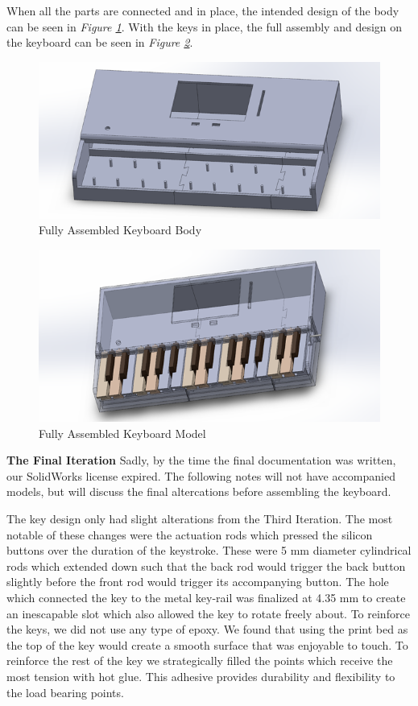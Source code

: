 When all the parts are connected and in place, the intended design of the body can be seen in \textit{Figure \ref{fig:final_model1}}. With the keys in place, the full assembly and design on the keyboard can be seen in \textit{Figure \ref{fig:final_model2}}.

\begin{figure}[h!]
  \centering
  \includegraphics[width=0.8\linewidth]{image/FinalModel1.png}
  \caption{Fully Assembled Keyboard Body}
  \label{fig:final_model1}
\end{figure}

\begin{figure}[h!]
  \centering
  \includegraphics[width=0.8\linewidth]{image/FinalModel2.png}
  \caption{Fully Assembled Keyboard Model}
  \label{fig:final_model2}
\end{figure}
\clearpage

\textbf{The Final Iteration}
Sadly, by the time the final documentation was written, our SolidWorks license expired. The following notes will not have accompanied models, but will discuss the final altercations before assembling the keyboard.

The key design only had slight alterations from the Third Iteration. The most notable of these changes were the actuation rods which pressed the silicon buttons over the duration of the keystroke. These were 5 mm diameter cylindrical rods which extended down such that the back rod would trigger the back button slightly before the front rod would trigger its accompanying button. The hole which connected the key to the metal key-rail was finalized at 4.35 mm to create an inescapable slot which also allowed the key to rotate freely about. To reinforce the keys, we did not use any type of epoxy. We found that using the print bed as the top of the key would create a smooth surface that was enjoyable to touch. To reinforce the rest of the key we strategically filled the points which receive the most tension with hot glue. This adhesive provides durability and flexibility to the load bearing points.

